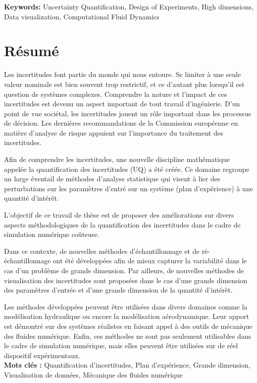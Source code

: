 \textbf{Keywords:} Uncertainty Quantification, Design of Experiments, High dimensions, Data visualization, Computational Fluid Dynamics %

\newpage
{}
\section*{Résumé}

Les incertitudes font partie du monde qui nous entoure. Se limiter à une seule valeur nominale est bien souvent trop restrictif, et ce d'autant plus lorsqu'il est question de systèmes complexes. Comprendre la nature et l'impact de ces incertitudes est devenu un aspect important de tout travail d'ingénierie. D'un point de vue sociétal, les incertitudes jouent un rôle important dans les processus de décision. Les dernières recommandations de la Commission européenne en matière d'analyse de risque appuient sur l'importance du traitement des incertitudes.

Afin de comprendre les incertitudes, une nouvelle discipline mathématique appelée la quantification des incertitudes (UQ) a été créée. Ce domaine regroupe un large éventail de méthodes d'analyse statistique qui visent à lier des perturbations sur les paramètres d'entré sur un système (plan d'expérience) à une quantité d'intérêt.

L'objectif de ce travail de thèse est de proposer des améliorations sur divers aspects méthodologiques de la quantification des incertitudes dans le cadre de simulation numérique coûteuse.

Dans ce contexte, de nouvelles méthodes d'échantillonnage et de ré-échantillonnage ont été développées afin de mieux capturer la variabilité dans le cas d'un problème de grande dimension. Par ailleurs, de nouvelles méthodes de visualisation des incertitudes sont proposées dans le cas d'une grande dimension des paramètres d'entrée et d'une grande dimension de la quantité d'intérêt.

Les méthodes développées peuvent être utilisées dans divers domaines comme la modélisation hydraulique ou encore la modélisation aérodynamique. Leur apport est démontré sur des systèmes réalistes en faisant appel à des outils de mécanique des fluides numérique. Enfin, ces méthodes ne sont pas seulement utilisables dans le cadre de simulation numérique, mais elles peuvent être utilisées sur de réel dispositif expérimentaux.\\

\textbf{Mots clés :} Quantification d'incertitudes, Plan d'expérience, Grande dimension, Visualisation de données, Mécanique des fluides numérique %





